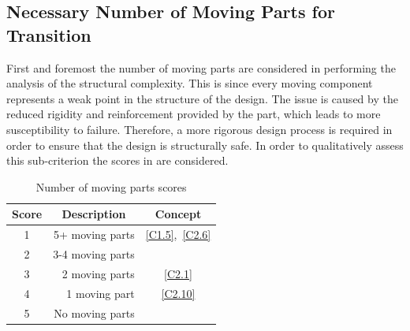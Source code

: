 \subsection{Necessary Number of Moving Parts for Transition}
First and foremost the number of moving parts are considered in performing the analysis of the structural complexity.
This is since every moving component represents a weak point in the structure of the design.
The issue is caused by the reduced rigidity and reinforcement provided by the part, which leads to more susceptibility to failure. 
Therefore, a more rigorous design process is required in order to ensure that the design is structurally safe.
In order to qualitatively assess this sub-criterion the scores in  are considered.
\begin{table}[ht]
\centering
\caption{Number of moving parts scores}
\label{tab:movingpartstoff}
\begin{tabular}{c|r|c}
\toprule
  
\textbf{Score} & \multicolumn{1}{c|}{\textbf{Description}} & \textbf{Concept} \\ \bottomrule
\rowcolor[HTML]{FD6864} 
1              & 5+ moving parts      & \ref{C1.5},~\ref{C2.6}         \\
\rowcolor[HTML]{FCBF7B} 
2              & 3-4 moving parts     &                  \\
\rowcolor[HTML]{E0E383} 
3              & 2 moving parts       & \ref{C2.1}              \\
\rowcolor[HTML]{A2D07F} 
4              & 1 moving part\phantom{s}        & \ref{C2.10}             \\
\rowcolor[HTML]{63BE7B} 
5              & No moving parts      &                  \\ \toprule
\end{tabular}
\end{table}

